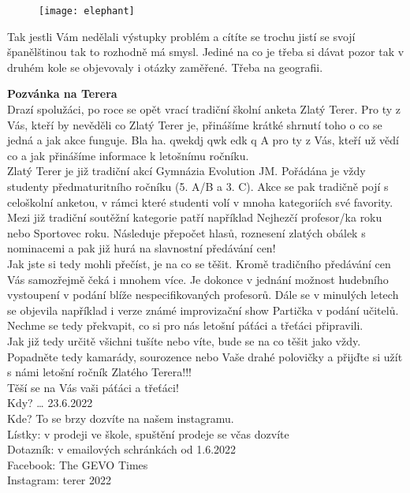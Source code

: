 \documentclass[a4paper]{article}
\begin{document}
\begin{multicols}{2}
\begin{wrapfigure}{r}{0.15\textwidth}
	\texttt{[image: elephant]} 
\end{wrapfigure}
Tak jestli Vám nedělali výstupky problém a cítíte se trochu jistí se svojí španělštinou tak to rozhodně má smysl. Jediné na co je třeba si dávat pozor tak v druhém kole se objevovaly i otázky zaměřené. Třeba na geografii.

{\LARGE \textbf{Pozvánka na Terera}}\\

Drazí spolužáci, 
po roce se opět vrací tradiční školní anketa Zlatý
Terer. Pro ty z Vás, kteří by nevěděli co Zlatý
Terer je, přinášíme krátké shrnutí toho o co se 
jedná a jak akce funguje. Bla ha. qwekdj qwk edk q A pro ty z Vás, kteří už
vědí co a jak přinášíme informace k letošnímu 
ročníku. \\

Zlatý Terer je již tradiční akcí Gymnázia Evolution 
JM. Pořádána je vždy studenty předmaturitního 
ročníku (5. A/B a 3. C). Akce se pak tradičně pojí 
s celoškolní anketou, v rámci které studenti volí v 
mnoha kategoriích své favority. Mezi již tradiční 
soutěžní kategorie patří například Nejhezčí 
profesor/ka roku nebo Sportovec roku. 
Následuje přepočet hlasů, roznesení zlatých 
obálek s nominacemi a pak již hurá na slavnostní 
předávání cen! \\

Jak jste si tedy mohli přečíst, je na co se těšit. 
Kromě tradičního předávání cen Vás samozřejmě
čeká i mnohem více. Je dokonce v jednání 
možnost hudebního vystoupení v podání blíže 
nespecifikovaných profesorů. Dále se v minulých 
letech se objevila například i verze známé 
improvizační show Partička v podání učitelů. 
Nechme se tedy překvapit, co si pro nás letošní 
páťáci a třeťáci připravili. \\

Jak již tedy určitě všichni tušíte nebo víte, bude 
se na co těšit jako vždy. Popadněte tedy 
kamarády, sourozence nebo Vaše drahé 
polovičky a přijďte si užít s námi letošní ročník 
Zlatého Terera!!!\\

Těší se na Vás vaši páťáci a třeťáci!\\

Kdy? … 23.6.2022\\

Kde? To se brzy dozvíte na našem instagramu.\\

Lístky: v prodeji ve škole, spuštění prodeje se 
včas dozvíte\\

Dotazník: v emailových schránkách od 1.6.2022\\

Facebook: The GEVO Times\\

Instagram: terer 2022
\end{multicols}
\end{document}
